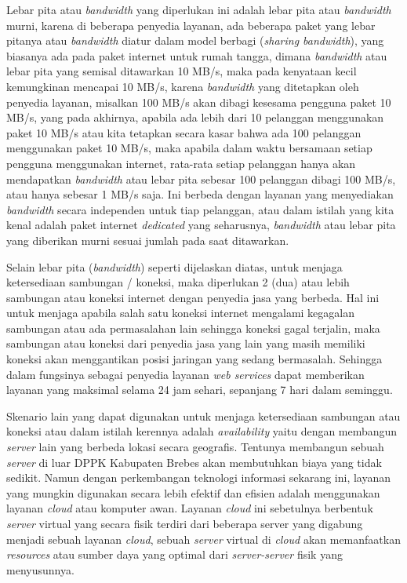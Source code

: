 \documentclass[pdftex,12pt, oneside]{article}
\begin{document}
\begin{enumerate}
Lebar pita atau \textit{bandwidth} yang diperlukan ini adalah lebar pita atau \textit{bandwidth} murni, karena di beberapa penyedia layanan, ada beberapa paket yang lebar pitanya atau \textit{bandwidth} diatur dalam model berbagi (\textit{sharing bandwidth}), yang biasanya ada pada paket internet untuk rumah tangga, dimana \textit{bandwidth} atau lebar pita yang semisal ditawarkan 10 MB/s, maka pada kenyataan kecil kemungkinan mencapai 10 MB/s, karena \textit{bandwidth} yang ditetapkan oleh penyedia layanan, misalkan 100 MB/s akan dibagi kesesama pengguna paket 10 MB/s, yang pada akhirnya, apabila ada lebih dari 10 pelanggan menggunakan paket 10 MB/s atau kita tetapkan secara kasar bahwa ada 100 pelanggan menggunakan paket 10 MB/s, maka apabila dalam waktu bersamaan setiap pengguna menggunakan internet, rata-rata setiap pelanggan hanya akan mendapatkan \textit{bandwidth} atau lebar pita sebesar 100 pelanggan dibagi 100 MB/s, atau hanya sebesar 1 MB/s saja. Ini berbeda dengan layanan yang menyediakan \textit{bandwidth} secara independen untuk tiap pelanggan, atau dalam istilah yang kita kenal adalah paket internet \textit{dedicated} yang seharusnya, \textit{bandwidth} atau lebar pita yang diberikan murni sesuai jumlah pada saat ditawarkan.

Selain lebar pita (\textit{bandwidth}) seperti dijelaskan diatas, untuk menjaga ketersediaan sambungan / koneksi, maka diperlukan 2 (dua) atau lebih sambungan atau koneksi internet dengan penyedia jasa yang berbeda. Hal ini untuk menjaga apabila salah satu koneksi internet mengalami kegagalan sambungan atau ada permasalahan lain sehingga koneksi gagal terjalin, maka sambungan atau koneksi dari penyedia jasa yang lain yang masih memiliki koneksi akan menggantikan posisi jaringan yang sedang bermasalah. Sehingga dalam fungsinya sebagai penyedia layanan \textit{web services} dapat memberikan layanan yang maksimal selama 24 jam sehari, sepanjang 7 hari dalam seminggu.

Skenario lain yang dapat digunakan untuk menjaga ketersediaan sambungan atau koneksi atau dalam istilah kerennya adalah \textit{availability} yaitu dengan membangun \textit{server} lain yang berbeda lokasi secara geografis. Tentunya membangun sebuah \textit{server} di luar DPPK Kabupaten Brebes akan membutuhkan biaya yang tidak sedikit. Namun dengan perkembangan teknologi informasi sekarang ini, layanan yang mungkin digunakan secara lebih efektif dan efisien adalah menggunakan layanan \textit{cloud} atau komputer awan. Layanan \textit{cloud} ini sebetulnya berbentuk \textit{server} virtual yang secara fisik terdiri dari beberapa server yang digabung menjadi sebuah layanan \textit{cloud}, sebuah \textit{server} virtual di \textit{cloud} akan memanfaatkan \textit{resources} atau sumber daya yang optimal dari \textit{server-server} fisik yang menyusunnya.


\end{enumerate}
\end{document}
